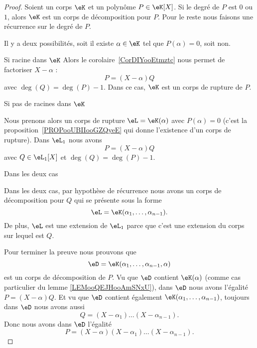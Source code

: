 \begin{proof}
    Soient un corps \( \eK\) et un polynôme \( P\in \eK[X]\). Si le degré de \( P\) est \( 0\) ou \( 1\), alors \( \eK\) est un corps de décomposition pour \( P\). Pour le reste nous faisons une récurrence sur le degré de \( P\).

    Il y a deux possibilités, soit il existe \( \alpha\in \eK\) tel que \( P(\alpha)=0\), soit non.

    \begin{subproof}
        \item[Si racine dans \( \eK\)]
            Alors le corolaire~\ref{CorDIYooEtmztc} nous permet de factoriser \( X-\alpha\) :
            \begin{equation}
                P=(X-\alpha)Q
            \end{equation}
            avec \( \deg(Q)=\deg(P)-1\). Dans ce cas, \( \eK\) est un corps de rupture de \( P\).

        \item[Si pas de racines dans \( \eK\)]

            Nous prenons alors un corps de rupture \( \eL=\eK(\alpha)\) avec \( P(\alpha)=0\) (c'est la proposition~\ref{PROPooUBIIooGZQyeE} qui donne l'existence d'un corps de rupture). Dans \( \eL_1\) nous avons
            \begin{equation}
                P=(X-\alpha)Q
            \end{equation}
            avec \( Q\in \eL_1[X]\) et \( \deg(Q)=\deg(P)-1\).

        \item[Dans les deux cas]

            Dans les deux cas, par hypothèse de récurrence nous avons un corps de décomposition pour \( Q\) qui se présente sous la forme
            \begin{equation}
                \eL=\eK(\alpha_1,\ldots, \alpha_{n-1}).
            \end{equation}
            De plus, \( \eL\) est une extension de \( \eL_1\) parce que c'est une extension du corps sur lequel est \( Q\).

    \end{subproof}
    Pour terminer la preuve nous prouvons que
    \begin{equation}
        \eD=\eK(\alpha_1,\ldots, \alpha_{n-1},\alpha)
    \end{equation}
    est un corps de décomposition de \( P\). Vu que \( \eD\) contient \( \eK(\alpha)\) (comme cas particulier du lemme \ref{LEMooQEJHooAmSNxU}), dans \( \eD\) nous avons l'égalité \( P=(X-\alpha)Q\). Et vu que \( \eD\) contient également \( \eK(\alpha_1,\ldots, \alpha_{n-1})\), toujours dans \( \eD\) nous avons aussi
    \begin{equation}
         Q=(X-\alpha_1)\ldots(X-\alpha_{n-1}).
    \end{equation}
    Donc nous avons dans \( \eD\) l'égalité
    \begin{equation}
        P=(X-\alpha)(X-\alpha_1)\ldots (X-\alpha_{n-1}).
    \end{equation}
\end{proof}

